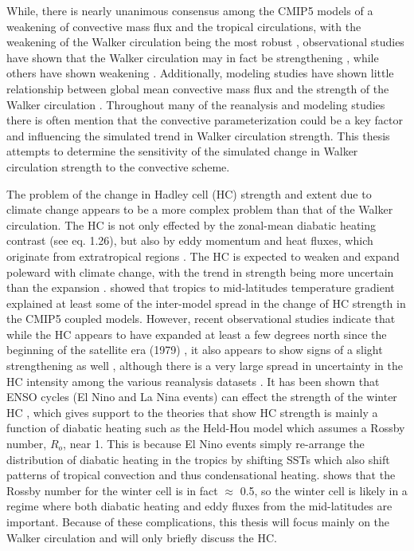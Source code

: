 \documentclass[letterpaper,12pt,titlepage,oneside,final]{book}
\begin{document}
While, there is nearly unanimous consensus among the CMIP5 models of a weakening of convective mass flux \cite{chadwick_spatial_2012} and the tropical circulations, with the weakening of the Walker circulation being the most robust \cite{he_anthropogenic_2015}, observational studies have shown that the Walker circulation may in fact be strengthening \cite{lheureux_recent_2013,sandeep_pacific_2014}, while others have shown weakening \cite{vecchi_weakening_2006,power_what_2011}. Additionally, modeling studies have shown little relationship between global mean convective mass flux and the strength of the Walker circulation \cite{sandeep_pacific_2014}. Throughout many of the reanalysis and modeling studies there is often mention that the convective parameterization could be a key factor and influencing the simulated trend in Walker circulation strength. This thesis attempts to determine the sensitivity of the simulated change in Walker circulation strength to the convective scheme.  

The problem of the change in Hadley cell (HC) strength and extent due to climate change appears to be a more complex problem than that of the Walker circulation. The HC is not only effected by the zonal-mean diabatic heating contrast (see eq. 1.26), but also by eddy momentum and heat fluxes, which originate from extratropical regions \cite{walker_eddy_2006,kim_hadley_2001}. The HC is expected to weaken and expand poleward with climate change, with the trend in strength being more uncertain than the expansion \cite{he_anthropogenic_2015,vecchi_global_2007,bony_robust_2013,gastineau_hadley_2009,ma_mechanisms_2011,lu_expansion_2007}. \cite{seo_mechanism_2014} showed that tropics to mid-latitudes temperature gradient explained at least some of the inter-model spread in the change of HC strength 
in the CMIP5 coupled models. However, recent observational studies indicate that while the HC appears to have expanded at least a few degrees north since the beginning of the satellite era (1979) \cite{johanson_hadley_2009,seidel_recent_2007,hu_observed_2007}, it also appears to show signs of a slight strengthening as well \cite{mitas_has_2005,hu_observed_2007,stachnik_comparison_2011}, although there is a very large spread in uncertainty in the HC intensity among the various reanalysis datasets \cite{stachnik_comparison_2011}. It has been shown that ENSO cycles (El Nino and La Nina events) can effect the strength of the winter HC \cite{oort_observed_1996,quan_change_2004}, which gives support to the theories that show HC strength is mainly a function of diabatic heating such as the Held-Hou model \cite{held_nonlinear_1980} which assumes a Rossby number, $R_{o}$, near 1. This is because El Nino events simply re-arrange the distribution of diabatic heating in the tropics by shifting SSTs which also shift patterns of tropical convection and thus condensational heating. \cite{caballero_role_2007} shows that the Rossby number for the winter cell is in fact $\approx$ 0.5, so the winter cell is likely in a regime where both diabatic heating and eddy fluxes from the mid-latitudes are important. Because of these complications, this thesis will focus mainly on the Walker circulation and will only briefly discuss the HC.
\end{document}
